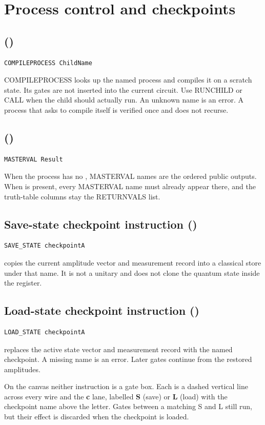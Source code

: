 \section{Process control and checkpoints}

\subsection{ (\implemented)}

\begin{lstlisting}
COMPILEPROCESS ChildName
\end{lstlisting}
COMPILEPROCESS looks up the named process and compiles it on a scratch state.
Its gates are not inserted into the current circuit. Use RUNCHILD or CALL when
the child should actually run. An unknown name is an error. A process that
asks to compile itself is verified once and does not recurse.

\subsection{ (\implemented)}

\begin{lstlisting}
MASTERVAL Result
\end{lstlisting}
When the process has no , MASTERVAL names are the ordered
public outputs. When  is present, every MASTERVAL name must
already appear there, and the truth-table columns stay the RETURNVALS list.

\subsection{Save-state checkpoint instruction (\implemented)}

\begin{lstlisting}
SAVE_STATE checkpointA
\end{lstlisting}
 copies the current amplitude vector and measurement record
into a classical store under that name. It is not a unitary and does not
clone the quantum state inside the register.

\subsection{Load-state checkpoint instruction (\implemented)}

\begin{lstlisting}
LOAD_STATE checkpointA
\end{lstlisting}
 replaces the active state vector and measurement record with
the named checkpoint. A missing name is an error. Later gates continue from
the restored amplitudes.

On the canvas neither instruction is a gate box. Each is a dashed vertical
line across every wire and the \textbf{c} lane, labelled \textbf{S} (save) or
\textbf{L} (load) with the checkpoint name above the letter. Gates between a
matching S and L still run, but their effect is discarded when the checkpoint
is loaded.

